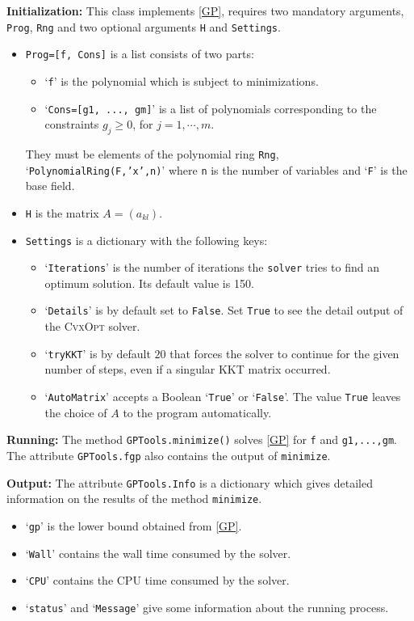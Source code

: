 \documentclass{amsart}
\theoremstyle{definition}
\begin{document}
\noindent\textbf{Initialization:}
This class implements \eqref{GP}, requires two mandatory arguments, \texttt{Prog}, \texttt{Rng} and two optional arguments \texttt{H} and 
\texttt{Settings}.
\begin{itemize}
	\item{\texttt{Prog=[f, Cons]} is a list consists of two parts:
	\begin{itemize}
		\item{`\texttt{f}' is the polynomial which is subject to minimizations.}
		\item{`\texttt{Cons=[g1, ..., gm]}' is a list of polynomials corresponding to the constraints $g_j\ge0$, for $j=1,\cdots,m$.}
	\end{itemize}
	They must be elements of the polynomial ring \texttt{Rng}, `\texttt{PolynomialRing(F,'x',n)}' where \texttt{n} is 
	the number of variables and `\texttt{F}' is the base field.}
	\item{\texttt{H} is the matrix $A=(a_{kl})$.}
	\item{\texttt{Settings} is a dictionary with the following keys:
	\begin{itemize}
		\item{`\texttt{Iterations}' is the number of iterations the \texttt{solver} tries to find an optimum solution. Its default value is 150.}
		\item{`\texttt{Details}' is by default set to \texttt{False}. Set \texttt{True} to see the detail output of the \textsc{CvxOpt} solver.}
		\item{`\texttt{tryKKT}' is by default $20$ that forces the solver to continue for the given number of steps, even if a singular KKT matrix 
		occurred.}
		\item{`\texttt{AutoMatrix}' accepts a Boolean `\texttt{True}' or `\texttt{False}'. The value \texttt{True} leaves the choice of $A$ to 
		the program automatically.}
	\end{itemize}
	}
\end{itemize}

\noindent\textbf{Running:}
The method \texttt{GPTools.minimize()} solves \eqref{GP} for \texttt{f} and \texttt{g1,...,gm}. 
The attribute \texttt{GPTools.fgp} also contains the output of \texttt{minimize}.

\noindent\textbf{Output:}
The attribute \texttt{GPTools.Info} is a dictionary which gives detailed information on the results of the method \texttt{minimize}.
\begin{itemize}
	\item{`\texttt{gp}' is the lower bound obtained from \eqref{GP}.}
	\item{`\texttt{Wall}' contains the wall time consumed by the solver.}
	\item{`\texttt{CPU}' contains the CPU time consumed by the solver.}
	\item{`\texttt{status}' and `\texttt{Message}' give some information about the running process.}
\end{itemize}
\end{document}
